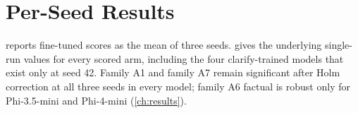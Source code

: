 \chapter{Per-Seed Results}
\label{app:B}
\label{app:perseed}

 reports fine-tuned scores as the mean of three seeds.  gives the underlying single-run values for every scored arm, including the four clarify-trained models that exist only at seed 42. Family A1 and family A7 remain significant after Holm correction at all three seeds in every model; family A6 factual is robust only for Phi-3.5-mini and Phi-4-mini (\cref{ch:results}).


